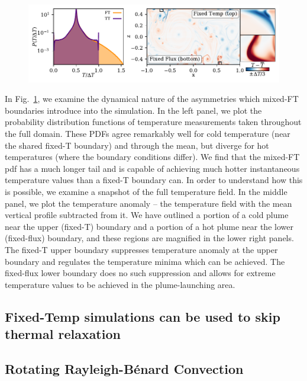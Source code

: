\documentclass[aps, pre, onecolumn, nofootinbib, notitlepage, groupedaddress, amsfonts, amssymb, amsmath, longbibliography]{revtex4-1}
\newcommand{\RB}{Rayleigh-B\'{e}nard }
\begin{document}
\begin{figure}
\includegraphics[width=\textwidth]{./figs/rbc_dynamics_asymmetries.pdf}
\caption{ 
\label{fig:rbc_dynamics_asymmetries} }
\end{figure}

In Fig.~\ref{fig:rbc_dynamics_asymmetries}, we examine the dynamical nature of the asymmetries which mixed-FT boundaries introduce into the simulation.
In the left panel, we plot the probability distribution functions of temperature measurements taken throughout the full domain.
These PDFs agree remarkably well for cold temperature (near the shared fixed-T boundary) and through the mean, but diverge for hot temperatures (where the boundary conditions differ).
We find that the mixed-FT pdf has a much longer tail and is capable of achieving much hotter instantaneous temperature values than a fixed-T boundary can.
In order to understand how this is possible, we examine a snapshot of the full temperature field.
In the middle panel, we plot the temperature anomaly -- the temperature field with the mean vertical profile subtracted from it.
We have outlined a portion of a cold plume near the upper (fixed-T) boundary and a portion of a hot plume near the lower (fixed-flux) boundary, and these regions are magnified in the lower right panels.
The fixed-T upper boundary suppresses temperature anomaly at the upper boundary and regulates the temperature minima which can be achieved.
The fixed-flux lower boundary does no such suppression and allows for extreme temperature values to be achieved in the plume-launching area.

\subsection{Fixed-Temp simulations can be used to skip thermal relaxation}


\subsection{Rotating \RB Convection}
\label{sec:rotating_results}
\end{document}
